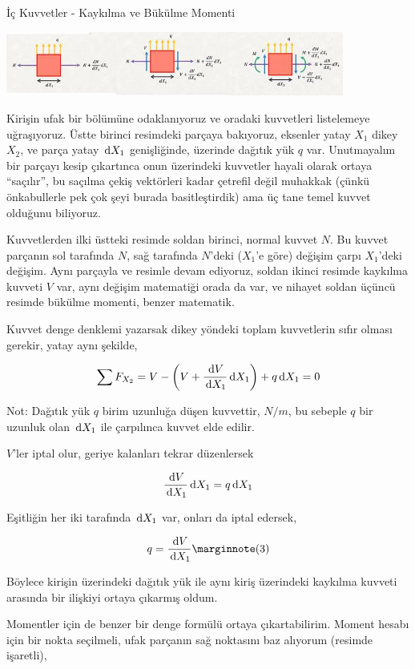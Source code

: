 \documentclass[12pt,fleqn]{article}\usepackage{../../common}
\begin{document}
İç Kuvvetler - Kaykılma ve Bükülme Momenti

\includegraphics[width=30em]{phy_020_strs_02_10.jpg}

Kirişin ufak bir bölümüne odaklanıyoruz ve oradaki kuvvetleri listelemeye
uğraşıyoruz. Üstte birinci resimdeki parçaya bakıyoruz, eksenler yatay $X_1$
dikey $X_2$, ve parça yatay $\,\mathrm{d} X_1$ genişliğinde, üzerinde dağıtık yük $q$
var. Unutmayalım bir parçayı kesip çıkartınca onun üzerindeki kuvvetler hayali
olarak ortaya ``saçılır'', bu saçılma çekiş vektörleri kadar çetrefil değil
muhakkak (çünkü önkabullerle pek çok şeyi burada basitleştirdik) ama üç tane
temel kuvvet olduğunu biliyoruz.

Kuvvetlerden ilki üstteki resimde soldan birinci, normal kuvvet $N$. Bu kuvvet
parçanın sol tarafında $N$, sağ tarafında $N$'deki ($X_1$'e göre) değişim çarpı
$X_1$'deki değişim. Aynı parçayla ve resimle devam ediyoruz, soldan ikinci
resimde kaykılma kuvveti $V$ var, aynı değişim matematiği orada da var, ve
nihayet soldan üçüncü resimde bükülme momenti, benzer matematik.

Kuvvet denge denklemi yazarsak dikey yöndeki toplam kuvvetlerin sıfır olması
gerekir, yatay aynı şekilde,

$$
\sum F_{X_2} = V - \left( V + \frac{\,\mathrm{d} V}{\,\mathrm{d} X_1} \,\mathrm{d} X_1 \right) + q \,\mathrm{d} X_1 = 0
$$

Not: Dağıtık yük $q$ birim uzunluğa düşen kuvvettir, $N/m$, bu sebeple $q$ bir
uzunluk olan $\,\mathrm{d} X_1$ ile çarpılınca kuvvet elde edilir.

$V$'ler iptal olur, geriye kalanları tekrar düzenlersek

$$
\frac{\,\mathrm{d} V}{\,\mathrm{d} X_1} \,\mathrm{d} X_1 = q \,\mathrm{d} X_1 
$$

Eşitliğin her iki tarafında $\,\mathrm{d} X_1$ var, onları da iptal edersek,

$$
q = \frac{\ud V}{\ud X_1}
\mlabel{3}
$$

Böylece kirişin üzerindeki dağıtık yük ile aynı kiriş üzerindeki kaykılma
kuvveti arasında bir ilişkiyi ortaya çıkarmış oldum. 

Momentler için de benzer bir denge formülü ortaya çıkartabilirim. Moment hesabı
için bir nokta seçilmeli, ufak parçanın sağ noktasını baz alıyorum (resimde
işaretli),
\end{document}

